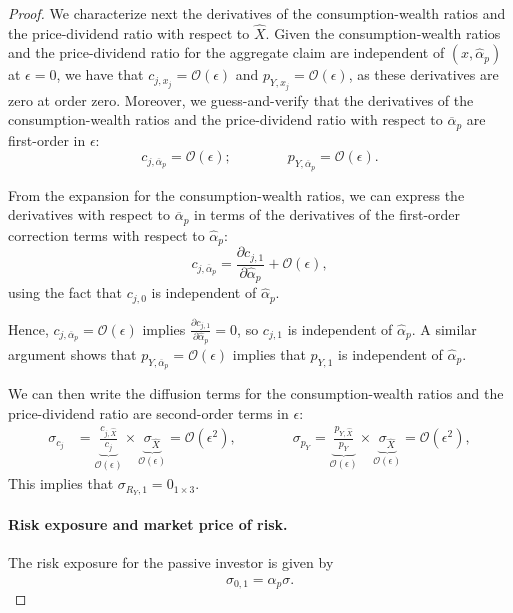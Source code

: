 \begin{proof}
We characterize next the derivatives of the consumption-wealth ratios and the price-dividend ratio with respect to $\hat{X}$.
Given the consumption-wealth ratios and the price-dividend ratio for the aggregate claim are independent of $(x, \hat{\alpha}_{p})$ at $\epsilon = 0$, we have that
$c_{j,x_j}=\mathcal{O}(\epsilon)$ and $p_{Y,x_j}=\mathcal{O}(\epsilon)$, as these derivatives are zero at order zero.
Moreover, we guess-and-verify that the derivatives of the consumption-wealth ratios and the price-dividend ratio with respect to $\overline{\alpha}_{p}$ are first-order in $\epsilon$:
\begin{equation}
    c_{j,\overline{\alpha}_{p}} = \mathcal{O}(\epsilon); \qquad \qquad p_{Y,\overline{\alpha}_{p}} = \mathcal{O}(\epsilon).
\end{equation}

From the expansion for the consumption-wealth ratios, we can express the derivatives with respect to $\overline{\alpha}_p$ in terms of the derivatives of the first-order correction terms with respect to $\hat{\alpha}_p$:
\begin{equation}
    c_{j,\overline{\alpha}_{p}} = \frac{\partial c_{j,1}}{\partial \hat{\alpha}_{p}}  +\mathcal{O}(\epsilon),
\end{equation}
using the fact that $c_{j,0}$ is independent of $\hat{\alpha}_p$.

Hence, $c_{j,\overline{\alpha}_{p}} = \mathcal{O}(\epsilon)$ implies $\frac{\partial c_{j,1}}{\partial \hat{\alpha}_{p}} = 0$, so $c_{j,1}$ is independent of $\hat{\alpha}_{p}$.
A similar argument shows that $p_{Y,\overline{\alpha}_{p}} = \mathcal{O}(\epsilon)$ implies that $p_{Y,1}$ is independent of $\hat{\alpha}_{p}$.

We can then write the diffusion terms for the consumption-wealth ratios and the price-dividend ratio are second-order terms in $\epsilon$:
\begin{align}
    \sigma_{c_j} &= \underbrace{\frac{c_{j,\hat{X}}}{c_j}}_{\mathcal{O}(\epsilon)} \times \underbrace{\sigma_{\hat{X}}}_{\mathcal{O}(\epsilon)} = \mathcal{O}(\epsilon^2), \qquad \qquad 
    \sigma_{p_Y} = \underbrace{\frac{p_{Y,\hat{X}}}{p_Y}}_{\mathcal{O}(\epsilon)} \times \underbrace{\sigma_{\hat{X}}}_{\mathcal{O}(\epsilon)} = \mathcal{O}(\epsilon^2),
\end{align}
This implies that $\sigma_{R_Y,1} = 0_{1\times 3}$.

\paragraph{Risk exposure and market price of risk.} The risk exposure for the passive investor is given by
\begin{equation}
    \sigma_{0,1} = \hat{\alpha}_{p} \sigma. 
\end{equation}


\end{proof}
